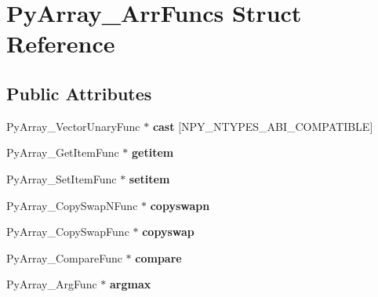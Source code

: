 \hypertarget{structPyArray__ArrFuncs}{}\section{Py\+Array\+\_\+\+Arr\+Funcs Struct Reference}
\label{structPyArray__ArrFuncs}
\subsection*{Public Attributes}
\begin{DoxyCompactItemize}
\item 
Py\+Array\+\_\+\+Vector\+Unary\+Func $\ast$ {\bfseries cast} \mbox{[}N\+P\+Y\+\_\+\+N\+T\+Y\+P\+E\+S\+\_\+\+A\+B\+I\+\_\+\+C\+O\+M\+P\+A\+T\+I\+B\+LE\mbox{]}\hypertarget{structPyArray__ArrFuncs_a2b589ebb31e0b1ef8ba2894526b3cd7a}{}\label{structPyArray__ArrFuncs_a2b589ebb31e0b1ef8ba2894526b3cd7a}

\item 
Py\+Array\+\_\+\+Get\+Item\+Func $\ast$ {\bfseries getitem}\hypertarget{structPyArray__ArrFuncs_a24438d123384b7076e6154fe45544c35}{}\label{structPyArray__ArrFuncs_a24438d123384b7076e6154fe45544c35}

\item 
Py\+Array\+\_\+\+Set\+Item\+Func $\ast$ {\bfseries setitem}\hypertarget{structPyArray__ArrFuncs_a7c5f03acca9916f26a3940012108a451}{}\label{structPyArray__ArrFuncs_a7c5f03acca9916f26a3940012108a451}

\item 
Py\+Array\+\_\+\+Copy\+Swap\+N\+Func $\ast$ {\bfseries copyswapn}\hypertarget{structPyArray__ArrFuncs_a735af946a549ca85846f66f7178dec0a}{}\label{structPyArray__ArrFuncs_a735af946a549ca85846f66f7178dec0a}

\item 
Py\+Array\+\_\+\+Copy\+Swap\+Func $\ast$ {\bfseries copyswap}\hypertarget{structPyArray__ArrFuncs_aaed7149b26cab64703a5e83e81c12b04}{}\label{structPyArray__ArrFuncs_aaed7149b26cab64703a5e83e81c12b04}

\item 
Py\+Array\+\_\+\+Compare\+Func $\ast$ {\bfseries compare}\hypertarget{structPyArray__ArrFuncs_a3d606baf68a5ff612056f59e7970b316}{}\label{structPyArray__ArrFuncs_a3d606baf68a5ff612056f59e7970b316}

\item 
Py\+Array\+\_\+\+Arg\+Func $\ast$ {\bfseries argmax}\hypertarget{structPyArray__ArrFuncs_a1a092b24ba00a034d0f50a7d7bd505cf}{}\label{structPyArray__ArrFuncs_a1a092b24ba00a034d0f50a7d7bd505cf}


\end{DoxyCompactItemize}
